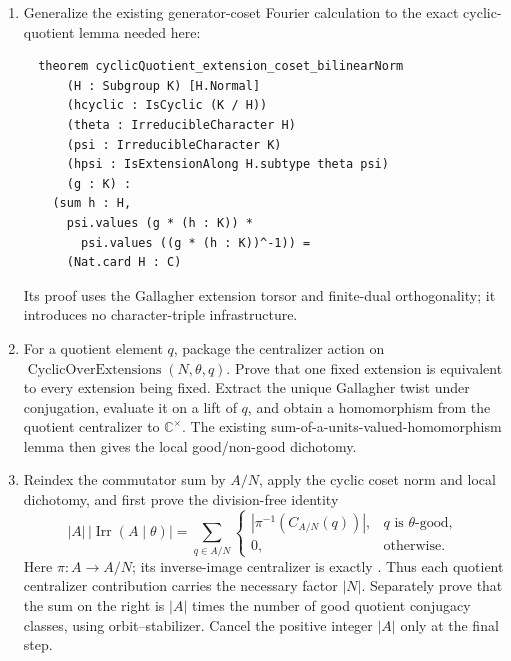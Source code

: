 \documentclass[11pt]{article}
\newcommand{\Irr}{\operatorname{Irr}}
\begin{document}
\begin{enumerate}[label=\textbf{P1.B\arabic*.},leftmargin=*]
\begin{lstlisting}
  theorem degree_mul_sum_gallagherCommutator
      (chi : IrreducibleCharacter A) :
    (chi.degree : C) *
        (sum x : A, sum y : A,
          chi.values (x^-1 * y^-1 * x * y)) =
      (Nat.card A : C) ^ 2
  \end{lstlisting}
  Prove these using the existing sum-of-conjugates operator, Schur's
  lemma, and irreducible-character orthogonality.
  \item Generalize the existing generator-coset Fourier calculation to the
  exact cyclic-quotient lemma needed here:
  \begin{lstlisting}
  theorem cyclicQuotient_extension_coset_bilinearNorm
      (H : Subgroup K) [H.Normal]
      (hcyclic : IsCyclic (K / H))
      (theta : IrreducibleCharacter H)
      (psi : IrreducibleCharacter K)
      (hpsi : IsExtensionAlong H.subtype theta psi)
      (g : K) :
    (sum h : H,
      psi.values (g * (h : K)) *
        psi.values ((g * (h : K))^-1)) =
      (Nat.card H : C)
  \end{lstlisting}
  Its proof uses the Gallagher extension torsor and finite-dual
  orthogonality; it introduces no character-triple infrastructure.
  \item For a quotient element \(q\), package the centralizer action on
  \(\operatorname{CyclicOverExtensions}(N,\theta,q)\).  Prove that one
  fixed extension is equivalent to every extension being fixed.  Extract
  the unique Gallagher twist under conjugation, evaluate it on a lift of
  \(q\), and obtain a homomorphism from the quotient centralizer to
  \(\mathbb C^\times\).  The existing sum-of-a-units-valued-homomorphism
  lemma then gives the local good/non-good dichotomy.
  \item Reindex the commutator sum by \(A/N\), apply the cyclic coset norm
  and local dichotomy, and first prove the division-free identity
  \[
    |A|\,|\Irr(A\mid\theta)|
      =\sum_{q\in A/N}
        \begin{cases}
          |\pi^{-1}(C_{A/N}(q))|,
            &q\text{ is \(\theta\)-good},\\
          0,&\text{otherwise}.
        \end{cases}
  \]
  Here \(\pi:A\to A/N\); its inverse-image centralizer is exactly
  .  Thus each quotient centralizer
  contribution carries the necessary factor \(|N|\).
  Separately prove that the sum on the right is
  \(|A|\) times the number of good quotient conjugacy classes, using
  orbit--stabilizer.  Cancel the positive integer \(|A|\) only at the
  final step.

\end{enumerate}
\end{document}
